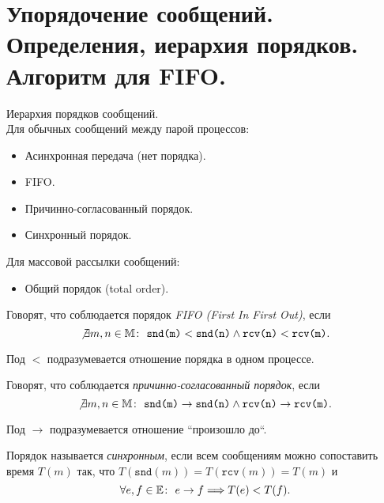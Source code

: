 \section{Упорядочение сообщений. Определения, иерархия порядков. Алгоритм для FIFO.}

\begin{definition}
    Иерархия порядков сообщений. \\
    Для обычных сообщений между парой процессов:
    \begin{itemize}
        \item Асинхронная передача (нет порядка).
        \item FIFO.
        \item Причинно-согласованный порядок.
        \item Синхронный порядок.
    \end{itemize}

    Для массовой рассылки сообщений:
    \begin{itemize}
        \item Общий порядок (total order).
    \end{itemize}
\end{definition}

\begin{definition}
    Говорят, что соблюдается порядок \textit{FIFO (First In First Out)}, если
    \[
        \not \exists m,n \in \mathbb{M} \colon~ \texttt{snd(m)} < \texttt{snd(n)}
        \wedge \texttt{rcv(n)} < \texttt{rcv(m)}
    .\]
\end{definition}

\begin{remark}
    Под $<$ подразумевается отношение порядка в одном процессе.
\end{remark}

\begin{definition}
    Говорят, что соблюдается \textit{причинно-согласованный порядок}, если
    \[
        \not \exists m,n \in \mathbb{M} \colon~ \texttt{snd(m)} \rightarrow \texttt{snd(n)}
        \wedge \texttt{rcv(n)} \rightarrow \texttt{rcv(m)}
    .\]
\end{definition}

\begin{remark}
    Под $\to$ подразумевается отношение ``произошло до``.
\end{remark}

\begin{definition}
    Порядок называется \textit{синхронным}, если всем сообщениям можно сопоставить время $T(m)$ так, что $T(\texttt{snd}(m)) = T(\texttt{rcv}(m)) = T(m)$ и
    \[
        \forall e,f \in \mathbb{E} \colon~ e \rightarrow f
        \Longrightarrow T(e) < T(f)
    .\]
\end{definition}


